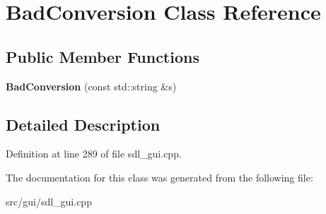 \hypertarget{classBadConversion}{\section{Bad\-Conversion Class Reference}
\label{classBadConversion}
}
\subsection*{Public Member Functions}
\begin{DoxyCompactItemize}
\item 
\hypertarget{classBadConversion_acf304d65e2a3f8a7ff2aa489ca3f28d6}{{\bfseries Bad\-Conversion} (const std\-::string \&s)}\label{classBadConversion_acf304d65e2a3f8a7ff2aa489ca3f28d6}

\end{DoxyCompactItemize}


\subsection{Detailed Description}


Definition at line 289 of file sdl\-\_\-gui.\-cpp.



The documentation for this class was generated from the following file\-:\begin{DoxyCompactItemize}
\item 
src/gui/sdl\-\_\-gui.\-cpp\end{DoxyCompactItemize}
